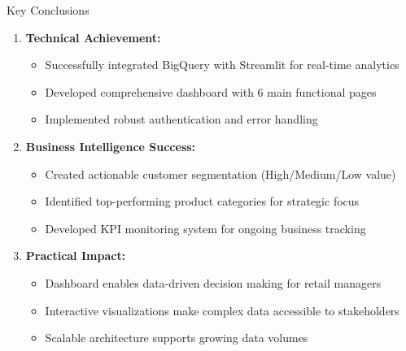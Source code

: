 \documentclass[aspectratio=169]{beamer}
\begin{document}
\begin{frame}{Key Conclusions}
\begin{enumerate}
    \item \textbf{Technical Achievement:}
    \begin{itemize}
        \item Successfully integrated BigQuery with Streamlit for real-time analytics
        \item Developed comprehensive dashboard with 6 main functional pages
        \item Implemented robust authentication and error handling
    \end{itemize}
    
    \item \textbf{Business Intelligence Success:}
    \begin{itemize}
        \item Created actionable customer segmentation (High/Medium/Low value)
        \item Identified top-performing product categories for strategic focus
        \item Developed KPI monitoring system for ongoing business tracking
    \end{itemize}
    
    \item \textbf{Practical Impact:}
    \begin{itemize}
        \item Dashboard enables data-driven decision making for retail managers
        \item Interactive visualizations make complex data accessible to stakeholders
        \item Scalable architecture supports growing data volumes
    \end{itemize}
\end{enumerate}
\end{frame}
\end{document}
